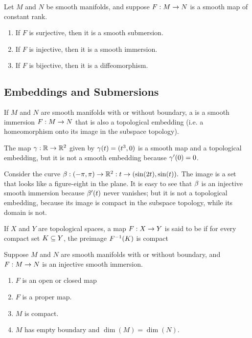 \begin{thm}
Let $M$ and $N$ be smooth manifolds, and suppose $F:M\rightarrow N$ is a smooth map of constant rank.
\begin{enumerate}
    \item If $F$ is surjective, then it is a smooth submersion.
    \item If $F$ is injective, then it is a smooth immersion.
    \item If $F$ is bijective, then it is a diffeomorphism.
\end{enumerate}
\end{thm}

\subsection{Embeddings and Submersions}\nl

\dfn If $M$ and $N$ are smooth manifolds with or without boundary, a  is a smooth immersion $F:M\rightarrow N$ that is also a topological embedding (i.e. a homeomorphism onto its image in the subspace topology).

\setcounter{thm}{17}

\begin{ex}
The map $\gamma:\mathbb{R}\rightarrow\mathbb{R}^2$ given by $\gamma(t) = (t^3,0)$ is a smooth map and a topological embedding, but it is not a smooth embedding because $\gamma^\prime(0) = 0$.
\end{ex}

\begin{ex}
Consider the curve $\beta:(-\pi,\pi)\rightarrow \mathbb{R}^2:t\rightarrow (\sin(2t), \sin(t)).$ The image is a set that looks like a figure-eight in the plane. It is easy to see that $\beta$ is an injective smooth immersion because $\beta^\prime(t)$ never vanishes; but it is not a topological embedding, because its image is compact in the subspace topology, while its domain is not.
\end{ex}

\setcounter{thm}{21}

\dfn If $X$ and $Y$ are topological spaces, a map $F:X\rightarrow Y$ is said to be  if for every compact set $K\subseteq Y$, the preimage $F^{-1}(K)$ is compact

\begin{prop}
Suppose $M$ and $N$ are smooth manifolds with or without boundary, and $F:M\rightarrow N$ is an injective smooth immersion. 
\begin{enumerate}
    \item $F$ is an open or closed map
    \item $F$ is a proper map.
    \item $M$ is compact.
    \item $M$ has empty boundary and $\dim(M) = \dim(N)$.
\end{enumerate}
\end{prop}

